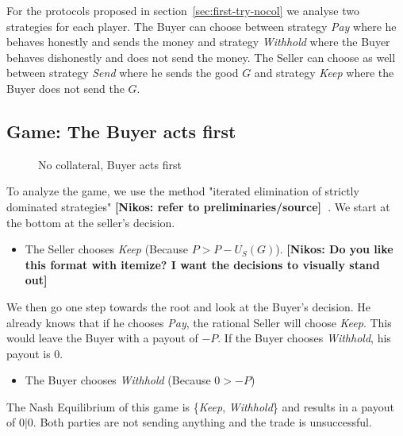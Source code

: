 \documentclass{cacthesis}
\newcommand{\authnote}[3]{{ \footnotesize \textbf{#1[#2: #3]~}}}
\newcommand{\niknote}[1]{\authnote{\color{red}}{Nikos}{#1}}
\begin{document}
For the protocols proposed in section~\ref{sec:first-try-nocol} we analyse two strategies for each player. The Buyer can choose between strategy \emph{Pay} where he behaves honestly and sends the money and strategy \emph{Withhold} where the Buyer behaves dishonestly and does not send the money. The Seller can choose as well between strategy \emph{Send} where he sends the good $G$ and strategy \emph{Keep} where the Buyer does not send the $G$.
\subsection{Game: The Buyer acts first}
\begin{figure}[htb!]
\centering
\caption{No collateral, Buyer acts first}
\label{fig:nocol-buyer-first}
\end{figure}

To analyze the game, we use the method "iterated elimination of strictly dominated strategies"\niknote{refer to preliminaries/source}. We start at the bottom at the seller's decision.
\begin{itemize}
    \item The Seller chooses \emph{Keep} (Because $P > P - U_S(G)$).\niknote{Do you like this format with itemize? I want the decisions to visually stand out}
\end{itemize}
    We then go one step towards the root and look at the Buyer's decision. He already knows that if he chooses \emph{Pay}, the rational Seller will choose \emph{Keep}. This would leave the Buyer with a payout of $-P$. If the Buyer chooses \emph{Withhold}, his payout is $0$.
\begin{itemize}
    \item The Buyer chooses \emph{Withhold} (Because $0 > -P$)
\end{itemize} 
The Nash Equilibrium of this game is \{\emph{Keep}, \emph{Withhold}\} and results in a payout of $0|0$. Both parties are not sending anything and the trade is unsuccessful.
\end{document}
